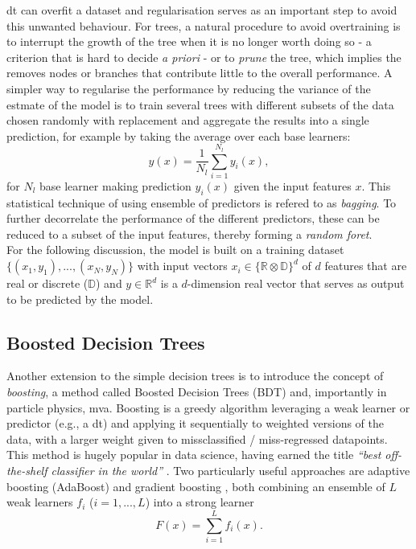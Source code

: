 \gls{dt} can overfit a dataset and regularisation serves as an important step to avoid this unwanted behaviour. For trees, a natural procedure to avoid overtraining is to interrupt the growth of the tree when it is no longer worth doing so - a criterion that is hard to decide \textit{a priori} - or to \textit{prune} the tree, which implies the removes nodes or branches that contribute little to the overall performance. A simpler way to regularise the performance by reducing the variance of the estmate of the model is to train several trees with different subsets of the data chosen randomly with replacement and aggregate the results into a single prediction, for example by taking the average over each base learners: \[ y(x) = \frac{1}{N_l} \sum_{i=1}^{N_l} y_i(x),\] for $N_l$ base learner making prediction $y_i(x)$ given the input features $x$. This statistical technique of using ensemble of predictors is refered to as \textit{bagging}. To further decorrelate the performance of the different predictors, these can be reduced to a subset of the input features, thereby forming a \textit{random foret}.\\
For the following discussion, the model is built on a training dataset $ \{(x_1, y_1), ..., (x_N, y_N)\}$ with input vectors $x_i \in \{\mathbb{R} \otimes \mathbb{D}\}^d$ of $d$ features that are real or discrete ($\mathbb{D}$) and $y \in \mathbb{R}^d$ is a $d$-dimension real vector that serves as output to be predicted by the model.

\subsection{Boosted Decision Trees}
Another extension to the simple decision trees is to introduce the concept of \textit{boosting}, a method called Boosted Decision Trees (BDT) and, importantly in particle physics, \gls{mva}. Boosting is a greedy algorithm leveraging a weak learner or predictor (e.g., a \gls{dt}) and applying it sequentially to weighted versions of the data, with a larger weight given to missclassified / miss-regressed datapoints. This method is hugely popular in data science, having earned the title \textit{``best off-the-shelf classifier in the world''} \cite{baggingML}. Two particularly useful approaches are adaptive boosting (AdaBoost) \cite{Adaboost} and gradient boosting \cite{gradientBoosting}, both combining an ensemble of $L$ weak learners $f_i$ ($i = 1, ..., L$) into a strong learner \[F(x) = \sum_{i=1}^L f_i(x).\] 

